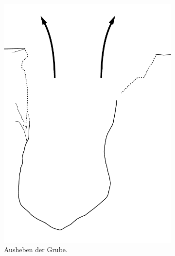 \begin{figure}[!tb]
	\centering
	\begin{subfigure}[t]{0.32\textwidth}
		\includegraphics[width = \textwidth, page = 1]{fig/MUN87-211_Ablauf.pdf}
		\caption{Ausheben der Grube.}
		\label{fig:MUN87.2-1-1_Sequenz_Skizze_01}
	\end{subfigure}\hspace{2mm}
	\begin{subfigure}[t]{0.32\textwidth}

\end{subfigure}
\end{figure}
